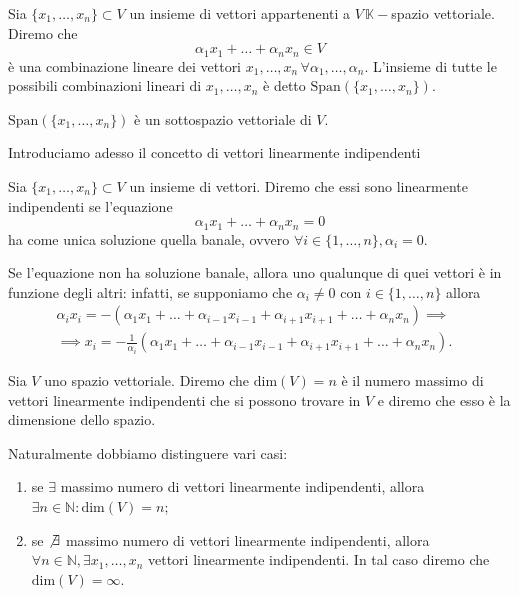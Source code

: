 \documentclass[12pt, twoside, italian, openany]{book}
\begin{document}
	\begin{definition}
		Sia $\{ x_1, \ldots, x_n \} \subset V$ un insieme di vettori appartenenti a $V \, \mathbb{K}-$spazio vettoriale. Diremo che
		$$
			\alpha_1 x_1 + \ldots + \alpha_n x_n \in V
		$$
		è una combinazione lineare dei vettori $x_1, \ldots, x_n \, \forall \alpha_1, \ldots, \alpha_n$. L'insieme di tutte le possibili combinazioni
		lineari di $x_1, \ldots, x_n$ è detto $\text{Span}(\{ x_1, \ldots, x_n \})$.
	\end{definition}
	\begin{prop}
		$\text{Span}(\{x_1, \ldots, x_n \})$ è un sottospazio vettoriale di $V$.
	\end{prop}
	Introduciamo adesso il concetto di vettori linearmente indipendenti
	\begin{definition}
		Sia $\{ x_1, \ldots, x_n \} \subset V$ un insieme di vettori. Diremo che essi sono linearmente indipendenti se l'equazione
		$$
			\alpha_1 x_1 + \ldots + \alpha_n x_n = 0
		$$
		ha come unica soluzione quella banale, ovvero $\forall i \in \{ 1, \ldots, n\}, \alpha_i = 0$.
	\end{definition}
	\begin{remark}
		Se l'equazione non ha soluzione banale, allora uno qualunque di quei vettori è in funzione degli altri: infatti, se supponiamo che $\alpha_i \neq 0$ con $i \in \{ 1, \ldots, n \}$ allora
		\begin{align*}
		&\alpha_i x_i = - (\alpha_1 x_1 + \ldots + \alpha_{i-1} x_{i-1} + \alpha_{i+1} x_{i+1} + \ldots +\alpha_n x_n) \implies &\\
		&\implies x_i = -\frac{1}{\alpha_i} (\alpha_1 x_1 + \ldots + \alpha_{i-1} x_{i-1} + \alpha_{i+1} x_{i+1} + \ldots + \alpha_n x_n). & &
		\end{align*}
	\end{remark}
	\begin{definition}
		Sia $V$ uno spazio vettoriale. Diremo che $\text{dim}(V) = n$ è il numero massimo di vettori linearmente indipendenti che si possono trovare in $V$ e diremo che esso è la dimensione dello spazio.
	\end{definition}
	Naturalmente dobbiamo distinguere vari casi:
	\begin{enumerate}[label=\protect\circled{\arabic*}]
		\item se $\exists$ massimo numero di vettori linearmente indipendenti, allora $\exists n \in \mathbb{N} : \text{dim}(V) = n$;
		\item se $\not\exists$ massimo numero di vettori linearmente indipendenti, allora $\forall n \in \mathbb{N}, \exists x_1, \ldots, x_n$ vettori linearmente indipendenti. In tal caso diremo che $\text{dim}(V) = \infty$.
	\end{enumerate}
\end{document}
